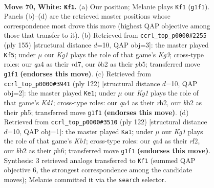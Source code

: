 \documentclass[11pt]{article}
\begin{document}
\clearpage

\begin{figure}[p]\centering
\begin{subfigure}{0.46\textwidth}\centering
\resizebox{\linewidth}{!}{%
\newchessgame
\chessboard[
  setfen={8/8/8/7R/qp6/3k1B2/1b6/6K1 w - - 30 70},
  showmover=false,
  pgfstyle=straightmove, color=movearrow, markmove={g1-f1}
]}
\caption{}
\end{subfigure}\hfill
\begin{subfigure}{0.46\textwidth}\centering
\resizebox{\linewidth}{!}{%
\newchessgame
\chessboard[
  setfen={8/3R4/6k1/1P6/8/2b2K2/8/4r3 b - - 2 78},
  showmover=false,
  pgfstyle=straightmove, color=movearrow, markmove={g6-f5}
]}
\caption{}
\end{subfigure}
\\[4pt]
\begin{subfigure}{0.46\textwidth}\centering
\resizebox{\linewidth}{!}{%
\newchessgame
\chessboard[
  setfen={8/4k3/R7/4p2p/8/3B4/7r/3K4 w - - 0 62},
  showmover=false,
  pgfstyle=straightmove, color=movearrow, markmove={d1-e1}
]}
\caption{}
\end{subfigure}\hfill
\begin{subfigure}{0.46\textwidth}\centering
\resizebox{\linewidth}{!}{%
\newchessgame
\chessboard[
  setfen={8/3R4/2B3kp/8/8/8/5r2/1K6 w - - 15 62},
  showmover=false,
  pgfstyle=straightmove, color=movearrow, markmove={b1-a1}
]}
\caption{}
\end{subfigure}
\caption{\textbf{Move 70, White: \texttt{Kf1}.} (a) Our position; Melanie plays \texttt{Kf1} (\texttt{g1f1}). Panels (b)--(d) are the retrieved master positions whose correspondence most drove this move (highest QAP objective among those that transfer to it). (b) Retrieved from \texttt{ccrl\_top\_p0000\#2255} (ply 155) [structural distance $d$=10, QAP obj=3]: the master played \texttt{Kf5}; under $\mu$ our \emph{Kg1} plays the role of that game's \emph{Kg3}; cross-type roles: our \emph{q}a4 as their \emph{r}d7, our \emph{b}b2 as their \emph{p}b5; transferred move \texttt{g1f1} \textbf{(endorses this move)}. (c) Retrieved from \texttt{ccrl\_top\_p0000\#3941} (ply 122) [structural distance $d$=10, QAP obj=2]: the master played \texttt{Ke1}; under $\mu$ our \emph{Kg1} plays the role of that game's \emph{Kd1}; cross-type roles: our \emph{q}a4 as their \emph{r}h2, our \emph{b}b2 as their \emph{p}h5; transferred move \texttt{g1f1} \textbf{(endorses this move)}. (d) Retrieved from \texttt{ccrl\_top\_p0000\#3510} (ply 122) [structural distance $d$=10, QAP obj=1]: the master played \texttt{Ka1}; under $\mu$ our \emph{Kg1} plays the role of that game's \emph{Kb1}; cross-type roles: our \emph{q}a4 as their \emph{r}f2, our \emph{b}b2 as their \emph{p}h6; transferred move \texttt{g1f1} \textbf{(endorses this move)}. Synthesis: 3 retrieved analogs transferred to \texttt{Kf1} (summed QAP objective 6, the strongest correspondence among the candidate moves); Melanie committed it via the \texttt{search} selector.}
\label{fig:thought-m138}
\end{figure}
\end{document}
